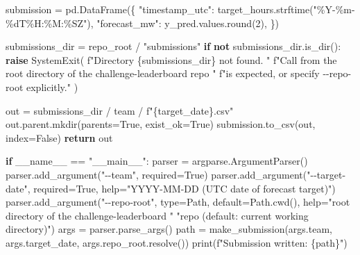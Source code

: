 \documentclass[
  english,
  letterpaper,
]{scrbook}
\newenvironment{Shaded}{\begin{snugshade}}{\end{snugshade}}
\newcommand{\BuiltInTok}[1]{\textcolor[rgb]{0.00,0.23,0.31}{#1}}
\newcommand{\ControlFlowTok}[1]{\textcolor[rgb]{0.00,0.23,0.31}{\textbf{#1}}}
\newcommand{\DecValTok}[1]{\textcolor[rgb]{0.68,0.00,0.00}{#1}}
\newcommand{\KeywordTok}[1]{\textcolor[rgb]{0.00,0.23,0.31}{\textbf{#1}}}
\newcommand{\NormalTok}[1]{\textcolor[rgb]{0.00,0.23,0.31}{#1}}
\newcommand{\OperatorTok}[1]{\textcolor[rgb]{0.37,0.37,0.37}{#1}}
\newcommand{\PreprocessorTok}[1]{\textcolor[rgb]{0.68,0.00,0.00}{#1}}
\newcommand{\SpecialCharTok}[1]{\textcolor[rgb]{0.37,0.37,0.37}{#1}}
\newcommand{\SpecialStringTok}[1]{\textcolor[rgb]{0.13,0.47,0.30}{#1}}
\newcommand{\StringTok}[1]{\textcolor[rgb]{0.13,0.47,0.30}{#1}}
\newcommand{\VariableTok}[1]{\textcolor[rgb]{0.07,0.07,0.07}{#1}}
\begin{document}
\begin{Shaded}
\begin{Highlighting}[]
\NormalTok{    submission }\OperatorTok{=}\NormalTok{ pd.DataFrame(\{}
        \StringTok{"timestamp\_utc"}\NormalTok{: target\_hours.strftime(}\StringTok{"\%Y{-}\%m{-}}\SpecialCharTok{\%d}\StringTok{T\%H:\%M:\%SZ"}\NormalTok{),}
        \StringTok{"forecast\_mw"}\NormalTok{: y\_pred.values.}\BuiltInTok{round}\NormalTok{(}\DecValTok{2}\NormalTok{),}
\NormalTok{    \})}

\NormalTok{    submissions\_dir }\OperatorTok{=}\NormalTok{ repo\_root }\OperatorTok{/} \StringTok{"submissions"}
    \ControlFlowTok{if} \KeywordTok{not}\NormalTok{ submissions\_dir.is\_dir():}
        \ControlFlowTok{raise} \PreprocessorTok{SystemExit}\NormalTok{(}
            \SpecialStringTok{f"Directory \textquotesingle{}}\SpecialCharTok{\{}\NormalTok{submissions\_dir}\SpecialCharTok{\}}\SpecialStringTok{\textquotesingle{} not found. "}
            \SpecialStringTok{f"Call from the root directory of the challenge{-}leaderboard repo "}
            \SpecialStringTok{f"is expected, or specify {-}{-}repo{-}root explicitly."}
\NormalTok{        )}

\NormalTok{    out }\OperatorTok{=}\NormalTok{ submissions\_dir }\OperatorTok{/}\NormalTok{ team }\OperatorTok{/} \SpecialStringTok{f"}\SpecialCharTok{\{}\NormalTok{target\_date}\SpecialCharTok{\}}\SpecialStringTok{.csv"}
\NormalTok{    out.parent.mkdir(parents}\OperatorTok{=}\VariableTok{True}\NormalTok{, exist\_ok}\OperatorTok{=}\VariableTok{True}\NormalTok{)}
\NormalTok{    submission.to\_csv(out, index}\OperatorTok{=}\VariableTok{False}\NormalTok{)}
    \ControlFlowTok{return}\NormalTok{ out}


\ControlFlowTok{if} \VariableTok{\_\_name\_\_} \OperatorTok{==} \StringTok{"\_\_main\_\_"}\NormalTok{:}
\NormalTok{    parser }\OperatorTok{=}\NormalTok{ argparse.ArgumentParser()}
\NormalTok{    parser.add\_argument(}\StringTok{"{-}{-}team"}\NormalTok{, required}\OperatorTok{=}\VariableTok{True}\NormalTok{)}
\NormalTok{    parser.add\_argument(}\StringTok{"{-}{-}target{-}date"}\NormalTok{, required}\OperatorTok{=}\VariableTok{True}\NormalTok{,}
                        \BuiltInTok{help}\OperatorTok{=}\StringTok{"YYYY{-}MM{-}DD (UTC date of forecast target)"}\NormalTok{)}
\NormalTok{    parser.add\_argument(}\StringTok{"{-}{-}repo{-}root"}\NormalTok{, }\BuiltInTok{type}\OperatorTok{=}\NormalTok{Path, default}\OperatorTok{=}\NormalTok{Path.cwd(),}
                        \BuiltInTok{help}\OperatorTok{=}\StringTok{"root directory of the challenge{-}leaderboard "}
                             \StringTok{"repo (default: current working directory)"}\NormalTok{)}
\NormalTok{    args }\OperatorTok{=}\NormalTok{ parser.parse\_args()}
\NormalTok{    path }\OperatorTok{=}\NormalTok{ make\_submission(args.team, args.target\_date, args.repo\_root.resolve())}
    \BuiltInTok{print}\NormalTok{(}\SpecialStringTok{f"Submission written: }\SpecialCharTok{\{}\NormalTok{path}\SpecialCharTok{\}}\SpecialStringTok{"}\NormalTok{)}
\end{Highlighting}
\end{Shaded}
\end{document}
